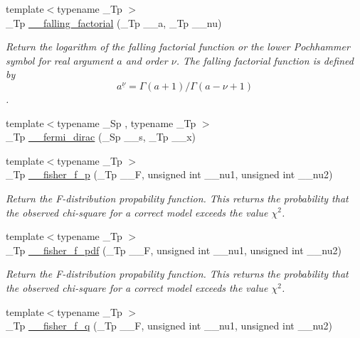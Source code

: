 \begin{DoxyCompactItemize}
{\footnotesize template$<$typename \+\_\+\+Tp $>$ }\\\+\_\+\+Tp \hyperlink{namespacestd_1_1____detail_a7cde2bf518e7ea3a0db2bec8f41b6465}{\+\_\+\+\_\+falling\+\_\+factorial} (\+\_\+\+Tp \+\_\+\+\_\+a, \+\_\+\+Tp \+\_\+\+\_\+nu)
\begin{DoxyCompactList}\small\item\em Return the logarithm of the falling factorial function or the lower Pochhammer symbol for real argument $ a $ and order $ \nu $. The falling factorial function is defined by \[ a^{\underline{\nu}} = \Gamma(a + 1) / \Gamma(a - \nu + 1) \]. \end{DoxyCompactList}\item 
{\footnotesize template$<$typename \+\_\+\+Sp , typename \+\_\+\+Tp $>$ }\\\+\_\+\+Tp \hyperlink{namespacestd_1_1____detail_a470e563c4e88c433f94dca391814dc61}{\+\_\+\+\_\+fermi\+\_\+dirac} (\+\_\+\+Sp \+\_\+\+\_\+s, \+\_\+\+Tp \+\_\+\+\_\+x)
\item 
{\footnotesize template$<$typename \+\_\+\+Tp $>$ }\\\+\_\+\+Tp \hyperlink{namespacestd_1_1____detail_aee8f7c61fee93660eede2ed37cf58386}{\+\_\+\+\_\+fisher\+\_\+f\+\_\+p} (\+\_\+\+Tp \+\_\+\+\_\+F, unsigned int \+\_\+\+\_\+nu1, unsigned int \+\_\+\+\_\+nu2)
\begin{DoxyCompactList}\small\item\em Return the F-\/distribution propability function. This returns the probability that the observed chi-\/square for a correct model exceeds the value $ \chi^2 $. \end{DoxyCompactList}\item 
{\footnotesize template$<$typename \+\_\+\+Tp $>$ }\\\+\_\+\+Tp \hyperlink{namespacestd_1_1____detail_a2f85415264800034e969f86ac8294f7b}{\+\_\+\+\_\+fisher\+\_\+f\+\_\+pdf} (\+\_\+\+Tp \+\_\+\+\_\+F, unsigned int \+\_\+\+\_\+nu1, unsigned int \+\_\+\+\_\+nu2)
\begin{DoxyCompactList}\small\item\em Return the F-\/distribution propability function. This returns the probability that the observed chi-\/square for a correct model exceeds the value $ \chi^2 $. \end{DoxyCompactList}\item 
{\footnotesize template$<$typename \+\_\+\+Tp $>$ }\\\+\_\+\+Tp \hyperlink{namespacestd_1_1____detail_ab3a5fe5d7e73a36a2d22d6093dfa0c55}{\+\_\+\+\_\+fisher\+\_\+f\+\_\+q} (\+\_\+\+Tp \+\_\+\+\_\+F, unsigned int \+\_\+\+\_\+nu1, unsigned int \+\_\+\+\_\+nu2)

\end{DoxyCompactItemize}
